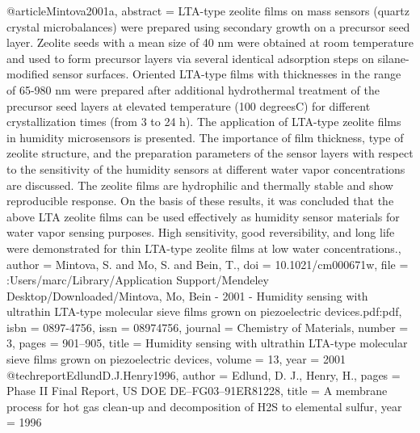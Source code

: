 @article{Mintova2001a,
abstract = {LTA-type zeolite films on mass sensors (quartz crystal microbalances) were prepared using secondary growth on a precursor seed layer. Zeolite seeds with a mean size of 40 nm were obtained at room temperature and used to form precursor layers via several identical adsorption steps on silane-modified sensor surfaces. Oriented LTA-type films with thicknesses in the range of 65-980 nm were prepared after additional hydrothermal treatment of the precursor seed layers at elevated temperature (100 degreesC) for different crystallization times (from 3 to 24 h). The application of LTA-type zeolite films in humidity microsensors is presented. The importance of film thickness, type of zeolite structure, and the preparation parameters of the sensor layers with respect to the sensitivity of the humidity sensors at different water vapor concentrations are discussed. The zeolite films are hydrophilic and thermally stable and show reproducible response. On the basis of these results, it was concluded that the above LTA zeolite films can be used effectively as humidity sensor materials for water vapor sensing purposes. High sensitivity, good reversibility, and long life were demonstrated for thin LTA-type zeolite films at low water concentrations.},
author = {Mintova, S. and Mo, S. and Bein, T.},
doi = {10.1021/cm000671w},
file = {:Users/marc/Library/Application Support/Mendeley Desktop/Downloaded/Mintova, Mo, Bein - 2001 - Humidity sensing with ultrathin LTA-type molecular sieve films grown on piezoelectric devices.pdf:pdf},
isbn = {0897-4756},
issn = {08974756},
journal = {Chemistry of Materials},
number = {3},
pages = {901--905},
title = {{Humidity sensing with ultrathin LTA-type molecular sieve films grown on piezoelectric devices}},
volume = {13},
year = {2001}
}
@techreport{EdlundD.J.Henry1996,
author = {{Edlund, D. J., Henry}, H.},
pages = {Phase II Final Report, US DOE DE--FG03--91ER81228},
title = {{A membrane process for hot gas clean-up and decomposition of H2S to elemental sulfur}},
year = {1996}
}
